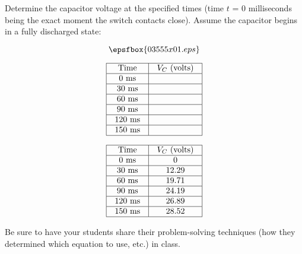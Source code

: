 

Determine the capacitor voltage at the specified times (time $t$ = 0 milliseconds being the exact moment the switch contacts close).  Assume the capacitor begins in a fully discharged state:

$$\epsfbox{03555x01.eps}$$


$$\vbox{\offinterlineskip
\halign{\strut
\vrule \quad\hfil # \ \hfil & 
\vrule \quad\hfil # \ \hfil \vrule \cr
\noalign{\hrule}
%
Time & $V_C$ (volts) \cr
%
\noalign{\hrule}
%
0 ms &  \cr
%
\noalign{\hrule}
%
30 ms &  \cr
%
\noalign{\hrule}
%
60 ms &  \cr
%
\noalign{\hrule}
%
90 ms &  \cr
%
\noalign{\hrule}
%
120 ms &  \cr
%
\noalign{\hrule}
%
150 ms &  \cr
%
\noalign{\hrule}
} %
}$$ %








$$\vbox{\offinterlineskip
\halign{\strut
\vrule \quad\hfil # \ \hfil & 
\vrule \quad\hfil # \ \hfil \vrule \cr
\noalign{\hrule}
%
Time & $V_C$ (volts) \cr
%
\noalign{\hrule}
%
0 ms & 0 \cr
%
\noalign{\hrule}
%
30 ms & 12.29 \cr
%
\noalign{\hrule}
%
60 ms & 19.71 \cr
%
\noalign{\hrule}
%
90 ms & 24.19 \cr
%
\noalign{\hrule}
%
120 ms & 26.89 \cr
%
\noalign{\hrule}
%
150 ms & 28.52 \cr
%
\noalign{\hrule}
} %
}$$ %







Be sure to have your students share their problem-solving techniques (how they determined which equation to use, etc.) in class.




